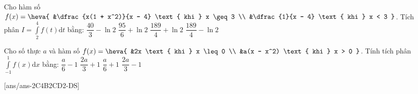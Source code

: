 \begin{ex}%
	Cho hàm số $f(x) = \heva{
		&\dfrac{x(1 + x^2)}{x - 4} \text{ khi } x \geq 3 \\
		&\dfrac{1}{x - 4} \text{ khi } x < 3 
	}$. Tích phân $I = \displaystyle\int\limits_{2}^{4} f(t) \mathrm{d}t$ bằng:
	\choice
	{$\dfrac{40}{3} - \ln 2$}
	{$\dfrac{95}{6} + \ln 2$}
	{$\dfrac{189}{4} + \ln 2$}
	{\True $\dfrac{189}{4} - \ln 2$}
\end{ex}
\begin{ex}%
	Cho số thực $a$ và hàm số $f(x) = \heva{
		&2x \text{ khi } x \leq 0 \\
		&a(x - x^2) \text{ khi } x > 0 
	}$. Tính tích phân $\displaystyle\int\limits_{-1}^{1} f(x) \mathrm{d}x$ bằng:
	\choice
	{\True $\dfrac{a}{6} - 1$}
	{$\dfrac{2a}{3} + 1$}
	{$\dfrac{a}{6} + 1$}
	{$\dfrac{2a}{3} - 1$}
\end{ex}
\TNTF
{}[ans/ans-2C4B2CD2-DS]
